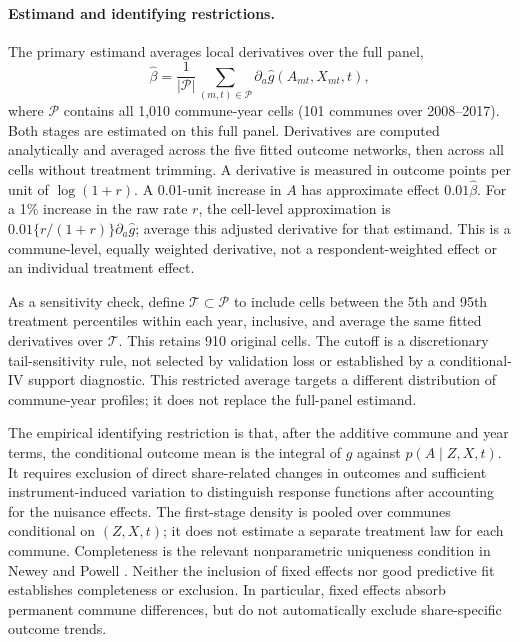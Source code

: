 \paragraph{Estimand and identifying restrictions.}
The primary estimand averages local derivatives over the full panel,
\begin{equation}
\widehat\beta=\frac{1}{|\mathcal P|}
\sum_{(m,t)\in\mathcal P}\partial_a\widehat g(A_{mt},X_{mt},t),
\label{eq:neural-effect}
\end{equation}
where $\mathcal P$ contains all 1,010 commune-year cells (101 communes over 2008--2017). Both stages are estimated on this full panel. Derivatives are computed analytically and averaged across the five fitted outcome networks, then across all cells without treatment trimming. A derivative is measured in outcome points per unit of $\log(1+r)$. A 0.01-unit increase in $A$ has approximate effect $0.01\widehat\beta$. For a 1\% increase in the raw rate $r$, the cell-level approximation is $0.01\{r/(1+r)\}\partial_a\widehat g$; average this adjusted derivative for that estimand. This is a commune-level, equally weighted derivative, not a respondent-weighted effect or an individual treatment effect.

As a sensitivity check, define $\mathcal T\subset\mathcal P$ to include cells between the 5th and 95th treatment percentiles within each year, inclusive, and average the same fitted derivatives over $\mathcal T$. This retains 910 original cells. The cutoff is a discretionary tail-sensitivity rule, not selected by validation loss or established by a conditional-IV support diagnostic. This restricted average targets a different distribution of commune-year profiles; it does not replace the full-panel estimand.

The empirical identifying restriction is that, after the additive commune and year terms, the conditional outcome mean is the integral of $g$ against $p(A\mid Z,X,t)$. It requires exclusion of direct share-related changes in outcomes and sufficient instrument-induced variation to distinguish response functions after accounting for the nuisance effects. The first-stage density is pooled over communes conditional on $(Z,X,t)$; it does not estimate a separate treatment law for each commune. Completeness is the relevant nonparametric uniqueness condition in Newey and Powell \cite{neweypowell}. Neither the inclusion of fixed effects nor good predictive fit establishes completeness or exclusion. In particular, fixed effects absorb permanent commune differences, but do not automatically exclude share-specific outcome trends.

